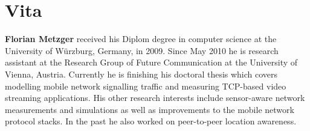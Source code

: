 \chapter*{Vita}
%

\textbf{Florian Metzger} received his Diplom degree in computer science at the University of Würzburg, Germany, in 2009. Since May 2010 he is research assistant at the Research Group of Future Communication at the University of Vienna, Austria. Currently he is finishing his doctoral thesis which covers modelling mobile network signalling traffic and measuring TCP-based video streaming applications. His other research interests include sensor-aware network measurements and simulations as well as improvements to the mobile network protocol stacks. In the past he also worked on peer-to-peer location awareness.
